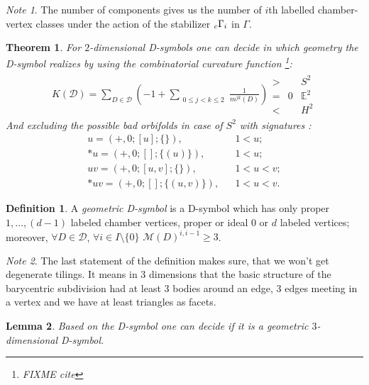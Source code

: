 \documentclass[12pt,a4paper]{article}
\numberwithin{equation}{section}
\newcommand{\leftsub}[2]{{\vphantom{#2}}_{#1}{#2}}
\theoremstyle{plain}%
\newtheorem{thm}{Theorem}[section]
\newtheorem{lem}[thm]{Lemma}
\theoremstyle{definition}
\newtheorem{defn}{Definition}[section]
\theoremstyle{remark}
\newtheorem*{note}{Note}
\begin{document}
\begin{note}
  The number of components gives us the number of $i$th labelled chamber-vertex
  classes under the action of the stabilizer $\leftsub{c}{\Gamma}_i$ in $\Gamma$.
\end{note}

\begin{thm}
  \label{thm:curvature}
  For $2$-dimensional D-symbols one can decide in which geometry the
  D-symbol realizes by using the {\em combinatorial curvature function}
  \footnote{FIXME cite}:
  \begin{align*}
    K(\mathcal{D})=\sum_{D\in
    \mathcal{D}}\left(-1+\sum_{\substack{0\le j<k\le 2}}\frac{1}{m^{jk}(D)}\right)
    \begin{array}{cccc}
      > & & S^2 \\
      = & 0 & \mathbb{E}^2 \\
      < & & H^2
    \end{array}
  \end{align*}
  And excluding the possible bad orbifolds in case of $S^2$ with 
  signatures \cite{Ma67}:
  \begin{align*}
    u=(+,0;[u];\{\}), & & 1<u;\\
    *u=(+,0;[];\{(u)\}), & & 1<u;\\
    uv=(+,0;[u,v];\{\}), & & 1<u<v;\\
    *uv=(+,0;[];\{(u,v)\}), & & 1<u<v.
  \end{align*}
\end{thm}

\begin{defn}
  A {\em geometric D-symbol} is a D-symbol which
  has only proper $1,\ldots,(d-1)$ labeled chamber vertices, proper or ideal $0$ or
  $d$ labeled vertices; moreover, $\forall D\in \mathcal{D}$, $\forall i\in
  I\setminus\{0\}$ $\mathcal{M}(D)^{i,i-1}\geq3$.
\end{defn}

\begin{note}
  The last statement of the definition makes sure, that we won't get degenerate
  tilings. It means in $3$ dimensions that the basic structure of the barycentric
  subdivision had at least 3 bodies around an edge, 3 edges meeting in a
  vertex and we have at least triangles as facets.
\end{note}

\begin{lem}
  Based on the D-symbol one can decide if it is a geometric $3$-dimensional
  D-symbol.
\end{lem}
\end{document}
